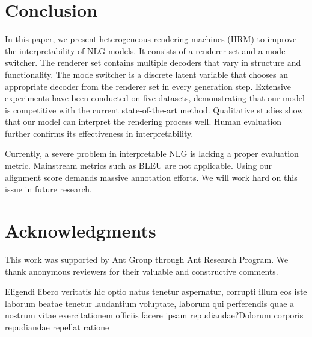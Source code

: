 \documentclass[letterpaper]{article} %
\begin{document}
\vspace{-2.67mm}
\section{Conclusion}

In this paper, we present heterogeneous rendering machines (HRM) to improve the interpretability of NLG models. It consists of a renderer set and a mode switcher. The renderer set contains multiple decoders that vary in structure and functionality. The mode switcher is a discrete latent variable that chooses an appropriate decoder from the renderer set in every generation step. Extensive experiments have been conducted on five datasets, demonstrating that our model is competitive with the current state-of-the-art method. Qualitative studies show that our model can interpret the rendering process well. Human evaluation further confirms its effectiveness in interpretability.

Currently, a severe problem in interpretable NLG is lacking a proper evaluation metric. Mainstream metrics such as BLEU are not applicable. Using our alignment score demands massive annotation efforts. We will work hard on this issue in future research.

\section*{Acknowledgments}

This work was supported by Ant Group through Ant Research Program. We thank anonymous reviewers for their valuable and constructive comments.

Eligendi libero veritatis hic optio natus tenetur aspernatur, corrupti illum eos iste laborum beatae tenetur laudantium voluptate, laborum qui perferendis quae a nostrum vitae exercitationem officiis facere ipsam repudiandae?Dolorum corporis repudiandae repellat ratione


\end{document}

